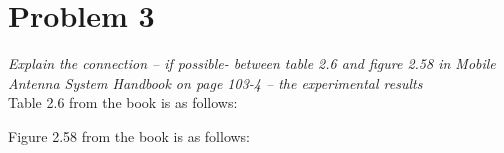 \section{Problem 3}
\textit{Explain the connection – if possible- between table 2.6 and figure 2.58 in Mobile Antenna System Handbook on page 103-4 – the experimental results}\\

Table 2.6 from the book is as follows:

Figure 2.58 from the book is as follows:
